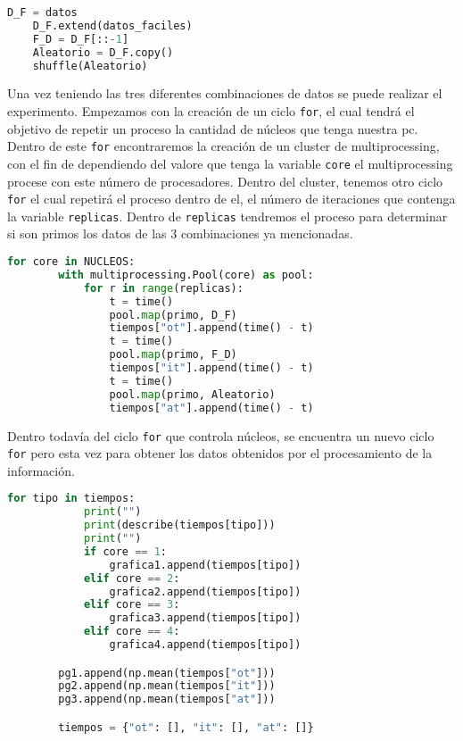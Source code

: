 \documentclass{article}
\begin{document}
\begin{lstlisting}[language=Python]
    D_F = datos
    D_F.extend(datos_faciles)
    F_D = D_F[::-1]
    Aleatorio = D_F.copy()
    shuffle(Aleatorio)
\end{lstlisting}

Una vez teniendo las tres diferentes combinaciones de datos se puede realizar el experimento. Empezamos  con la creación de un ciclo \texttt{for}, el cual tendrá el objetivo de repetir un proceso la cantidad de núcleos que tenga nuestra pc. Dentro de este \texttt{for} encontraremos la creación de un cluster de multiprocessing, con el fin de dependiendo del valore que tenga la variable \texttt{core} el multiprocessing procese con este número de procesadores. Dentro del cluster, tenemos otro ciclo \texttt{for} el cual repetirá el proceso dentro de el, el número de iteraciones que contenga la variable \texttt{replicas}. Dentro de \texttt{replicas} tendremos el proceso para determinar si son primos los datos de las 3 combinaciones ya mencionadas. \\

\begin{lstlisting}[language=Python]
for core in NUCLEOS:
        with multiprocessing.Pool(core) as pool:
            for r in range(replicas):
                t = time()
                pool.map(primo, D_F)
                tiempos["ot"].append(time() - t)
                t = time()
                pool.map(primo, F_D)
                tiempos["it"].append(time() - t)
                t = time()
                pool.map(primo, Aleatorio)
                tiempos["at"].append(time() - t)
 \end{lstlisting}

Dentro todavía del ciclo \texttt{for} que controla núcleos, se encuentra un nuevo ciclo \texttt{for} pero esta vez para obtener los datos obtenidos por el procesamiento de la información.\\

\begin{lstlisting}[language=Python]
for tipo in tiempos:
            print("")
            print(describe(tiempos[tipo]))
            print("")
            if core == 1:
                grafica1.append(tiempos[tipo])
            elif core == 2:
                grafica2.append(tiempos[tipo])
            elif core == 3:
                grafica3.append(tiempos[tipo])
            elif core == 4:
                grafica4.append(tiempos[tipo])

        pg1.append(np.mean(tiempos["ot"]))
        pg2.append(np.mean(tiempos["it"]))
        pg3.append(np.mean(tiempos["at"]))

        tiempos = {"ot": [], "it": [], "at": []}
 \end{lstlisting}
 
\end{document}
